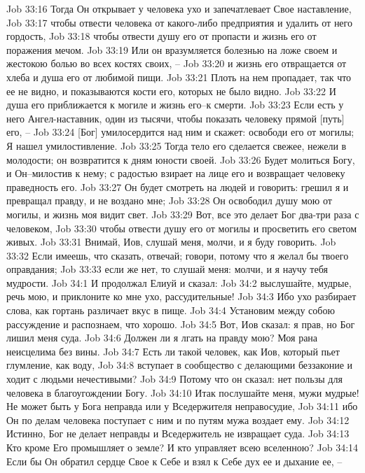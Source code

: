 Job 33:16  Тогда Он открывает у человека ухо и запечатлевает Свое наставление,
Job 33:17  чтобы отвести человека от какого-либо предприятия и удалить от него гордость,
Job 33:18  чтобы отвести душу его от пропасти и жизнь его от поражения мечом.
Job 33:19  Или он вразумляется болезнью на ложе своем и жестокою болью во всех костях своих, --
Job 33:20  и жизнь его отвращается от хлеба и душа его от любимой пищи.
Job 33:21  Плоть на нем пропадает, так что ее не видно, и показываются кости его, которых не было видно.
Job 33:22  И душа его приближается к могиле и жизнь его--к смерти.
Job 33:23  Если есть у него Ангел-наставник, один из тысячи, чтобы показать человеку прямой [путь] его, --
Job 33:24  [Бог] умилосердится над ним и скажет: освободи его от могилы; Я нашел умилостивление.
Job 33:25  Тогда тело его сделается свежее, нежели в молодости; он возвратится к дням юности своей.
Job 33:26  Будет молиться Богу, и Он--милостив к нему; с радостью взирает на лице его и возвращает человеку праведность его.
Job 33:27  Он будет смотреть на людей и говорить: грешил я и превращал правду, и не воздано мне;
Job 33:28  Он освободил душу мою от могилы, и жизнь моя видит свет.
Job 33:29  Вот, все это делает Бог два-три раза с человеком,
Job 33:30  чтобы отвести душу его от могилы и просветить его светом живых.
Job 33:31  Внимай, Иов, слушай меня, молчи, и я буду говорить.
Job 33:32  Если имеешь, что сказать, отвечай; говори, потому что я желал бы твоего оправдания;
Job 33:33  если же нет, то слушай меня: молчи, и я научу тебя мудрости.
Job 34:1  И продолжал Елиуй и сказал:
Job 34:2  выслушайте, мудрые, речь мою, и приклоните ко мне ухо, рассудительные!
Job 34:3  Ибо ухо разбирает слова, как гортань различает вкус в пище.
Job 34:4  Установим между собою рассуждение и распознаем, что хорошо.
Job 34:5  Вот, Иов сказал: я прав, но Бог лишил меня суда.
Job 34:6  Должен ли я лгать на правду мою? Моя рана неисцелима без вины.
Job 34:7  Есть ли такой человек, как Иов, который пьет глумление, как воду,
Job 34:8  вступает в сообщество с делающими беззаконие и ходит с людьми нечестивыми?
Job 34:9  Потому что он сказал: нет пользы для человека в благоугождении Богу.
Job 34:10  Итак послушайте меня, мужи мудрые! Не может быть у Бога неправда или у Вседержителя неправосудие,
Job 34:11  ибо Он по делам человека поступает с ним и по путям мужа воздает ему.
Job 34:12  Истинно, Бог не делает неправды и Вседержитель не извращает суда.
Job 34:13  Кто кроме Его промышляет о земле? И кто управляет всею вселенною?
Job 34:14  Если бы Он обратил сердце Свое к Себе и взял к Себе дух ее и дыхание ее, --
